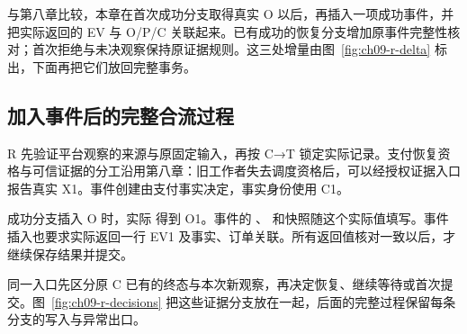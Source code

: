 与第八章比较，本章在首次成功分支取得真实 O 以后，再插入一项成功事件，并把实际返回的 EV 与 O/P/C 关联起来。已有成功的恢复分支增加原事件完整性核对；首次拒绝与未决观察保持原证据规则。这三处增量由图~\ref{fig:ch09-r-delta} 标出，下面再把它们放回完整事务。


\subsection*{加入事件后的完整合流过程}

R 先验证平台观察的来源与原固定输入，再按 C→T 锁定实际记录。支付恢复资格与可信证据的分工沿用第八章：旧工作者失去调度资格后，可以经授权证据入口报告真实 X1。事件创建由支付事实决定，事实身份使用 C1。

成功分支插入 O 时，实际  得到 O1。事件的 、 和快照随这个实际值填写。事件插入也要求实际返回一行 EV1 及事实、订单关联。所有返回值核对一致以后，才继续保存结果并提交。

同一入口先区分原 C 已有的终态与本次新观察，再决定恢复、继续等待或首次提交。图~\ref{fig:ch09-r-decisions} 把这些证据分支放在一起，后面的完整过程保留每条分支的写入与异常出口。


\clearpage

